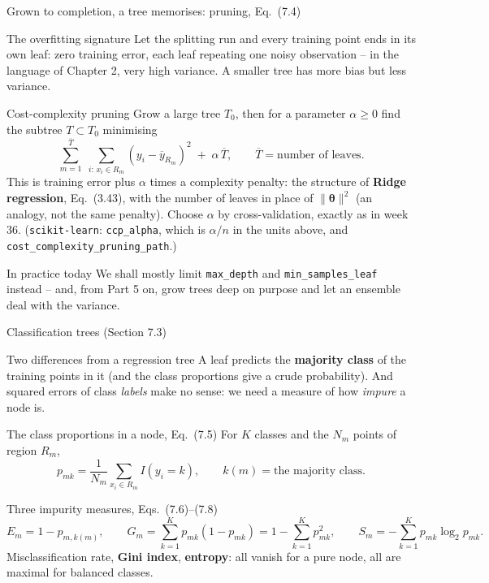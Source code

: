 \documentclass[10pt,aspectratio=169]{beamer}
\begin{document}
\begin{frame}{Grown to completion, a tree memorises: pruning, Eq.\ (7.4)}
\footnotesize
\begin{block}{The overfitting signature}
Let the splitting run and every training point ends in its own leaf: zero
training error, each leaf repeating one noisy observation -- in the language
of Chapter 2, very high variance.  A smaller tree has more bias but less
variance.
\end{block}
\begin{block}{Cost-complexity pruning}
Grow a large tree $T_0$, then for a parameter $\alpha\ge 0$ find the subtree
$T\subset T_0$ minimising
\[
  \sum_{m=1}^{\overline{T}}\;\sum_{i:\,x_i\in R_m}\left(y_i-\overline{y}_{R_m}\right)^{2}
  \;+\;\alpha\,\overline{T},
  \qquad \overline{T}=\text{number of leaves}.
\]
This is training error plus $\alpha$ times a complexity penalty: the
structure of \textbf{Ridge regression}, Eq.\ (3.43), with the number of leaves
in place of $\|\bm{\theta}\|^2$ (an analogy, not the same penalty).  Choose
$\alpha$ by cross-validation, exactly as in week 36.  (\texttt{scikit-learn}:
\texttt{ccp\_alpha}, which is $\alpha/n$ in the units above, and
\texttt{cost\_complexity\_pruning\_path}.)
\end{block}
\begin{block}{In practice today}
We shall mostly limit \texttt{max\_depth} and \texttt{min\_samples\_leaf}
instead -- and, from Part 5 on, grow trees deep on purpose and let an
ensemble deal with the variance.
\end{block}
\end{frame}

\begin{frame}{Classification trees (Section 7.3)}
\small\setlength{\abovedisplayskip}{3pt}\setlength{\belowdisplayskip}{3pt}
\begin{block}{Two differences from a regression tree}
A leaf predicts the \textbf{majority class} of the training points in it
(and the class proportions give a crude probability).  And squared errors
of class \emph{labels} make no sense: we need a measure of how \emph{impure}
a node is.
\end{block}
\begin{block}{The class proportions in a node, Eq.\ (7.5)}
For $K$ classes and the $N_m$ points of region $R_m$,
\[
  p_{mk}=\frac{1}{N_m}\sum_{x_i\in R_m} I(y_i=k),
  \qquad k(m)=\text{the majority class}.
\]
\end{block}
\begin{block}{Three impurity measures, Eqs.\ (7.6)--(7.8)}
\[
  E_m = 1-p_{m,k(m)},\qquad
  G_m = \sum_{k=1}^{K}p_{mk}(1-p_{mk}) = 1-\sum_{k=1}^{K}p_{mk}^{2},\qquad
  S_m = -\sum_{k=1}^{K}p_{mk}\log_2 p_{mk}.
\]
Misclassification rate, \textbf{Gini index}, \textbf{entropy}: all vanish
for a pure node, all are maximal for balanced classes.
\end{block}
\end{frame}
\end{document}
